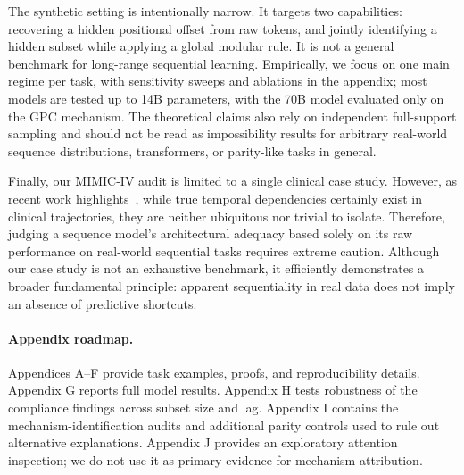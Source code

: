 \documentclass{article} %
\theoremstyle{plain}
\theoremstyle{definition}
\theoremstyle{remark}
\begin{document}
The synthetic setting is intentionally narrow. It targets two capabilities: recovering a hidden positional offset from raw tokens, and jointly identifying a hidden subset while applying a global modular rule. It is not a general benchmark for long-range sequential learning. Empirically, we focus on one main regime per task, with sensitivity sweeps and ablations in the appendix; most models are tested up to 14B parameters, with the 70B model evaluated only on the GPC mechanism. The theoretical claims also rely on independent full-support sampling and should not be read as impossibility results for arbitrary real-world sequence distributions, transformers, or parity-like tasks in general.

Finally, our MIMIC-IV audit is limited to a single clinical case study. However, as recent work highlights~\citep{edelman2026order_specific_ehr}, while true temporal dependencies certainly exist in clinical trajectories, they are neither ubiquitous nor trivial to isolate. Therefore, judging a sequence model's architectural adequacy based solely on its raw performance on real-world sequential tasks requires extreme caution. Although our case study is not an exhaustive benchmark, it efficiently demonstrates a broader fundamental principle: apparent sequentiality in real data does not imply an absence of predictive shortcuts.




\appendix

\paragraph{Appendix roadmap.}
Appendices A--F provide task examples, proofs, and reproducibility details. Appendix G reports full model results. Appendix H tests robustness of the compliance findings across subset size and lag. Appendix I contains the mechanism-identification audits and additional parity controls used to rule out alternative explanations. Appendix J provides an exploratory attention inspection; we do not use it as primary evidence for mechanism attribution.
\end{document}
